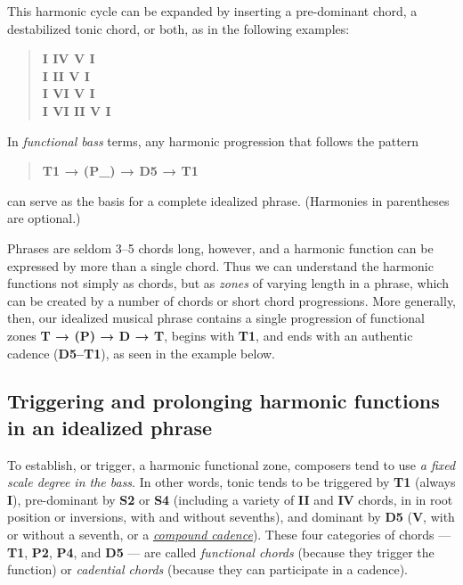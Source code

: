 \documentclass{book}
\begin{document}
This harmonic cycle can be expanded by inserting a pre-dominant chord, a
destabilized tonic chord, or both, as in the following examples:

\begin{quote}
\textbf{I IV V I}\\
\textbf{I II V I}\\
\textbf{I VI V I}\\
\textbf{I VI II V I}
\end{quote}

In \emph{functional bass} terms, any harmonic progression that follows the
pattern

\begin{quote}
\textbf{T1 → (P\_) → D5 → T1}
\end{quote}

can serve as the basis for a complete idealized phrase. (Harmonies in
parentheses are optional.)

Phrases are seldom 3--5 chords long, however, and a harmonic function can be
expressed by more than a single chord. Thus we can understand the harmonic
functions not simply as chords, but as \emph{zones} of varying length in a
phrase, which can be created by a number of chords or short chord
progressions. More generally, then, our idealized musical phrase contains a
single progression of functional zones \textbf{T → (P) → D → T}, begins with
\textbf{T1}, and ends with an authentic cadence (\textbf{D5--T1}), as seen in
the example below.

\hypertarget{triggering-and-prolonging-harmonic-functions-in-an-idealized-phrase-1}{%
\subsection{Triggering and prolonging harmonic functions in an idealized
phrase}\label{triggering-and-prolonging-harmonic-functions-in-an-idealized-phrase-1}}

To establish, or trigger, a harmonic functional zone, composers tend to use
\emph{a fixed scale degree in the bass}. In other words, tonic tends to be
triggered by \textbf{T1} (always \textbf{I}), pre-dominant by \textbf{S2} or
\textbf{S4} (including a variety of \textbf{II} and \textbf{IV} chords, in in
root position or inversions, with and without sevenths), and dominant by
\textbf{D5} (\textbf{V}, with or without a seventh, or a
\href{cadenceTypes}{\emph{compound cadence}}). These four categories of chords
--- \textbf{T1}, \textbf{P2}, \textbf{P4}, and \textbf{D5} --- are called
\emph{functional chords} (because they trigger the function) or
\emph{cadential chords} (because they can participate in a cadence).
\end{document}
